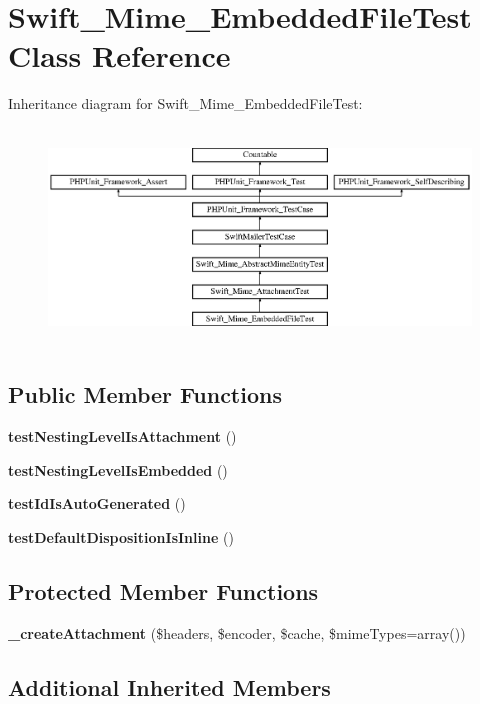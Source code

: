 \section{Swift\+\_\+\+Mime\+\_\+\+Embedded\+File\+Test Class Reference}
\label{class_swift___mime___embedded_file_test}
Inheritance diagram for Swift\+\_\+\+Mime\+\_\+\+Embedded\+File\+Test\+:\begin{figure}[H]
\begin{center}
\leavevmode
\includegraphics[height=5.781711cm]{class_swift___mime___embedded_file_test}
\end{center}
\end{figure}
\subsection*{Public Member Functions}
\begin{DoxyCompactItemize}
\item 
{\bf test\+Nesting\+Level\+Is\+Attachment} ()
\item 
{\bf test\+Nesting\+Level\+Is\+Embedded} ()
\item 
{\bf test\+Id\+Is\+Auto\+Generated} ()
\item 
{\bf test\+Default\+Disposition\+Is\+Inline} ()
\end{DoxyCompactItemize}
\subsection*{Protected Member Functions}
\begin{DoxyCompactItemize}
\item 
{\bf \+\_\+create\+Attachment} (\$headers, \$encoder, \$cache, \$mime\+Types=array())
\end{DoxyCompactItemize}
\subsection*{Additional Inherited Members}


